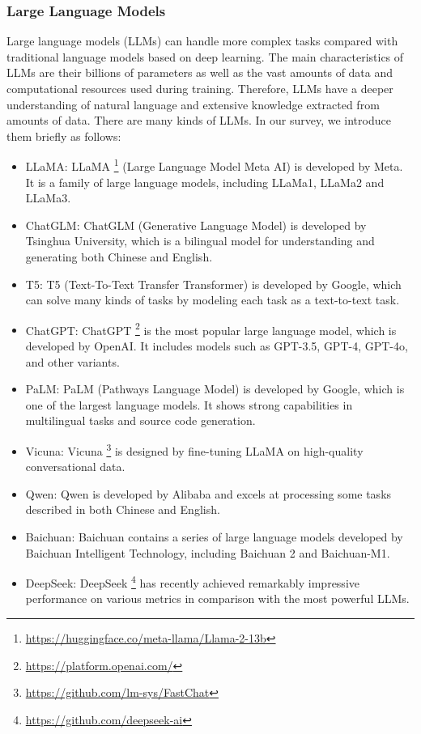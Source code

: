 \documentclass[review]{fcs}
\begin{document}
	\subsubsection{Large Language Models}
	Large language models (LLMs) can handle more complex tasks compared with traditional language models based on deep learning. The main characteristics of LLMs are their billions of parameters as well as the vast amounts of data and computational resources used during training. Therefore, LLMs have a deeper understanding of natural language and extensive knowledge extracted from amounts of data. There are many kinds of LLMs. In our survey, we introduce them briefly as follows:
	\begin{itemize}
		\item LLaMA: LLaMA \footnote{\url{https://huggingface.co/meta-llama/Llama-2-13b}} (Large Language Model Meta AI) is developed by Meta. It is a family of large language models, including LLaMa1, LLaMa2 and LLaMa3.
		\item ChatGLM: ChatGLM (Generative Language Model) is developed by Tsinghua University, which is a bilingual model for understanding and generating both Chinese and English.
		\item T5: T5 (Text-To-Text Transfer Transformer) is developed by Google, which can solve many kinds of tasks by modeling each task as a text-to-text task.
		\item ChatGPT: ChatGPT \footnote{\url{https://platform.openai.com/}} is the most popular large language model, which is developed by OpenAI. It includes models such as GPT-3.5, GPT-4, GPT-4o, and other variants.
		\item PaLM: PaLM (Pathways Language Model) is developed by Google, which is one of the largest language models. It shows strong capabilities in multilingual tasks and source code generation.
		\item Vicuna: Vicuna \footnote{\url{https://github.com/lm-sys/FastChat}} is designed by fine-tuning LLaMA on high-quality conversational data.
		\item Qwen: Qwen is developed by Alibaba and excels at processing some tasks described in both Chinese and English.
		\item Baichuan: Baichuan contains a series of large language models developed by Baichuan Intelligent Technology, including Baichuan 2 and Baichuan-M1.
		\item DeepSeek: DeepSeek \footnote{\url{https://github.com/deepseek-ai}} has recently achieved remarkably impressive performance on various metrics in comparison with the most powerful LLMs.
	\end{itemize}
\end{document}
